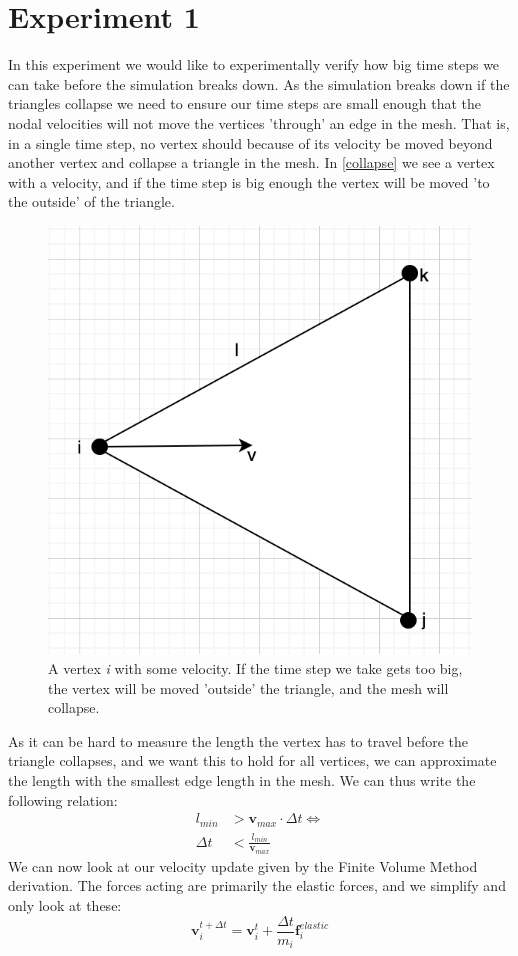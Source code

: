 \section{Experiment 1}
In this experiment we would like to experimentally verify how big time steps we can take before the simulation breaks down. As the simulation breaks down if the triangles collapse we need to ensure our time steps are small enough that the nodal velocities will not move the vertices 'through' an edge in the mesh. That is, in a single time step, no vertex should because of its velocity be moved beyond another vertex and collapse a triangle in the mesh. In \autoref{collapse} we see a vertex with a velocity, and if the time step is big enough the vertex will be moved 'to the outside' of the triangle. 
\begin{figure}
	\centering
	\includegraphics[width=0.55\linewidth]{Materials/collapse}
	\caption{A vertex \textit{i} with some velocity. If the time step we take gets too big, the vertex will be moved 'outside' the triangle, and the mesh will collapse.}
	\label{collapse}
\end{figure}
As it can be hard to measure the length the vertex has to travel before the triangle collapses, and we want this to hold for all vertices, we can approximate the length with the smallest edge length in the mesh. We can thus write the following relation:
\begin{align*}
	l_{min} &> \mathbf{v}_{max}\cdot \Delta t \iff \\
	\Delta t &< \frac{l_{min}}{\mathbf{v}_{max}}
\end{align*}
We can now look at our velocity update given by the Finite Volume Method derivation. The forces acting are primarily the elastic forces, and we simplify and only look at these:
\begin{equation*}
	\mathbf{v}^{t+\Delta t}_i = \mathbf{v}^t_i + \frac{\Delta t}{m_i}\mathbf{f}^{elastic}_i
\end{equation*}
